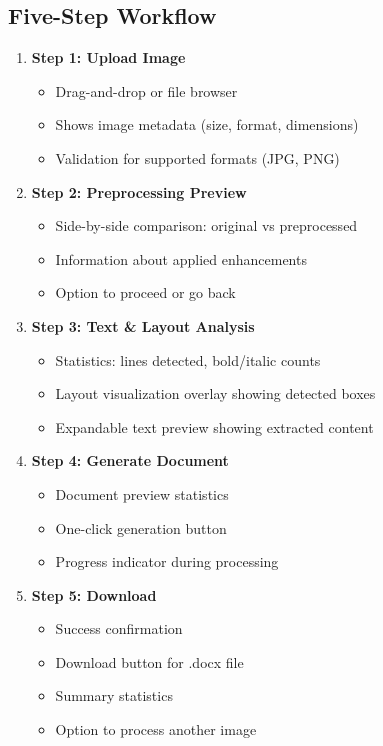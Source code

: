 \documentclass[12pt,a4paper]{article}
\begin{document}
\subsection{Five-Step Workflow}

\begin{enumerate}
    \item \textbf{Step 1: Upload Image}
    \begin{itemize}[noitemsep]
        \item Drag-and-drop or file browser
        \item Shows image metadata (size, format, dimensions)
        \item Validation for supported formats (JPG, PNG)
    \end{itemize}
    
    \item \textbf{Step 2: Preprocessing Preview}
    \begin{itemize}[noitemsep]
        \item Side-by-side comparison: original vs preprocessed
        \item Information about applied enhancements
        \item Option to proceed or go back
    \end{itemize}
    
    \item \textbf{Step 3: Text \& Layout Analysis}
    \begin{itemize}[noitemsep]
        \item Statistics: lines detected, bold/italic counts
        \item Layout visualization overlay showing detected boxes
        \item Expandable text preview showing extracted content
    \end{itemize}
    
    \item \textbf{Step 4: Generate Document}
    \begin{itemize}[noitemsep]
        \item Document preview statistics
        \item One-click generation button
        \item Progress indicator during processing
    \end{itemize}
    
    \item \textbf{Step 5: Download}
    \begin{itemize}[noitemsep]
        \item Success confirmation
        \item Download button for .docx file
        \item Summary statistics
        \item Option to process another image
    \end{itemize}
\end{enumerate}
\end{document}
